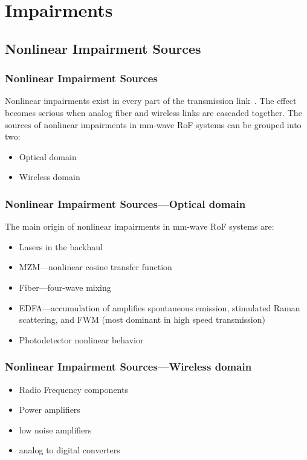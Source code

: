 \documentclass[t]{beamer}
\begin{document}
\section{Impairments}

\subsection{Nonlinear Impairment Sources}
\begin{frame}
    \frametitle{Nonlinear Impairment Sources}
    Nonlinear impairments exist in every part of the transmission link~\cite{Liu2017}.
    The effect becomes serious when analog fiber and wireless links are cascaded together.
    The sources of nonlinear impairments in mm-wave RoF systems can be grouped into two:
    \begin{itemize}
        \item Optical domain
        \item Wireless domain
    \end{itemize}
\end{frame}
\begin{frame}
    \frametitle{Nonlinear Impairment Sources---Optical domain}
    
    The main origin of nonlinear impairments in mm-wave RoF systems are:
    \begin{itemize}
        \item Lasers in the backhaul
        \item MZM---nonlinear cosine transfer function
        \item Fiber---four-wave mixing
        \item EDFA---accumulation of amplifies spontaneous emission, stimulated Raman scattering, and FWM (most dominant in high speed transmission)
        \item Photodetector nonlinear behavior
    \end{itemize}
\end{frame}
\begin{frame}
    \frametitle{Nonlinear Impairment Sources---Wireless domain}
    \begin{itemize}
        \item Radio Frequency components
        \item Power amplifiers
        \item low noise amplifiers
        \item analog to digital converters
    \end{itemize}
\end{frame}
\end{document}
